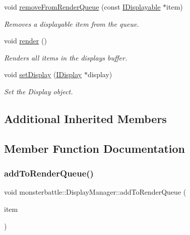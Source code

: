 \begin{DoxyCompactItemize}
void \hyperlink{classmonsterbattle_1_1DisplayManager_a2a616e9af9dfbd40a326b4348e62d807}{remove\+From\+Render\+Queue} (const \hyperlink{structmonsterbattle_1_1IDisplayable}{I\+Displayable} $\ast$item)
\begin{DoxyCompactList}\small\item\em Removes a displayable item from the queue. \end{DoxyCompactList}\item 
void \hyperlink{classmonsterbattle_1_1DisplayManager_af524ed6d4731be99258323f2b2735183}{render} ()
\begin{DoxyCompactList}\small\item\em Renders all items in the display\textquotesingle{}s buffer. \end{DoxyCompactList}\item 
void \hyperlink{classmonsterbattle_1_1DisplayManager_a3caf2bc163be4945bf4148e31717fc70}{set\+Display} (\hyperlink{structmonsterbattle_1_1IDisplay}{I\+Display} $\ast$display)
\begin{DoxyCompactList}\small\item\em Set the Display object. \end{DoxyCompactList}\end{DoxyCompactItemize}
\subsection*{Additional Inherited Members}


\subsection{Member Function Documentation}
\mbox{\label{classmonsterbattle_1_1DisplayManager_a0456f978666a4e9de318d5a2213a3891}} 
\subsubsection{\texorpdfstring{add\+To\+Render\+Queue()}{addToRenderQueue()}}
{\footnotesize\ttfamily void monsterbattle\+::\+Display\+Manager\+::add\+To\+Render\+Queue (\begin{DoxyParamCaption}\item[{const \hyperlink{structmonsterbattle_1_1IDisplayable}{I\+Displayable} $\ast$}]{item }\end{DoxyParamCaption})}



